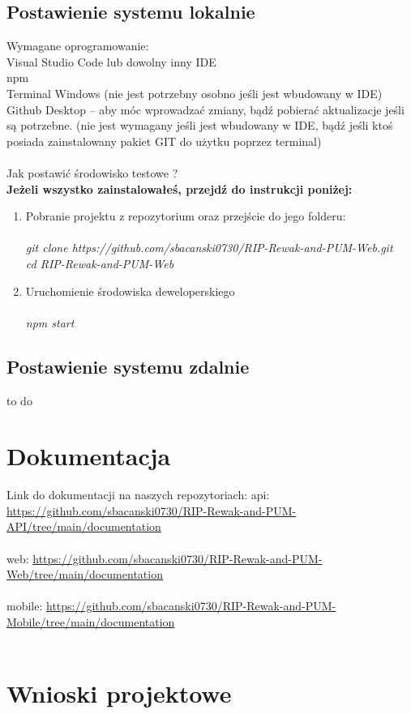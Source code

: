 \documentclass{article}
\begin{document}
\subsection{Postawienie systemu lokalnie}
Wymagane oprogramowanie:\\
Visual Studio Code lub dowolny inny IDE\\
npm\\
Terminal Windows (nie jest potrzebny osobno jeśli jest wbudowany w IDE)\\
Github Desktop – aby móc wprowadzać zmiany, bądź pobierać aktualizacje jeśli są potrzebne. (nie jest wymagany  jeśli jest wbudowany w IDE, bądź jeśli ktoś posiada zainstalowany pakiet GIT do użytku poprzez terminal)\\\\
Jak postawić środowisko testowe ?\\
\textbf{Jeżeli wszystko zainstalowałeś, przejdź do instrukcji poniżej:}
\begin{enumerate}
    \item Pobranie projektu z repozytorium oraz przejście do jego folderu: \\\\
    \emph{ git clone https://github.com/sbacanski0730/RIP-Rewak-and-PUM-Web.git} \\
   			 \emph{ cd RIP-Rewak-and-PUM-Web} \\
    \item Uruchomienie środowiska deweloperskiego\\\\
    \emph{npm start} \\
    \end{enumerate}
    

\subsection{Postawienie systemu zdalnie}
to do 


\section{Dokumentacja}
Link do dokumentacji na naszych repozytoriach: 
api: \url{https://github.com/sbacanski0730/RIP-Rewak-and-PUM-API/tree/main/documentation}\\\\
web: \url{https://github.com/sbacanski0730/RIP-Rewak-and-PUM-Web/tree/main/documentation}\\\\
mobile: \url{https://github.com/sbacanski0730/RIP-Rewak-and-PUM-Mobile/tree/main/documentation}\\\\

\section{Wnioski projektowe}
\end{document}
